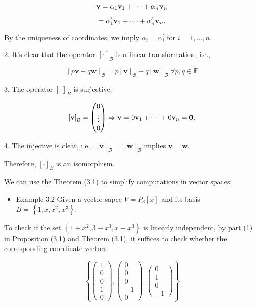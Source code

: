 \documentclass[11pt]{article}
\begin{document}
\[
\mathbf{v} = \alpha_1{\bf v}_1 + \cdots  + \alpha_n{\bf v}_n
\]

\[
= \alpha_1^{\prime }{\bf v}_1 + \cdots  + \alpha_n^{\prime }{\bf v}_n.
\]

By the uniqueness of coordinates, we imply \(\alpha_{i} = \alpha_{i}^{\prime }\) for \(i = 1,\ldots ,n\).

2. It’s clear that the operator \({\left\lbrack  \cdot \right\rbrack  }_{\mathcal{B}}\) is a linear transformation, i.e.,

\[
{\left\lbrack  p\mathbf{v} + q\mathbf{w}\right\rbrack  }_{\mathcal{B}} = p{\left\lbrack  \mathbf{v}\right\rbrack  }_{\mathcal{B}} + q{\left\lbrack  \mathbf{w}\right\rbrack  }_{\mathcal{B}}\;\forall p,q \in  \mathbb{F}
\]

3. The operator \({\left\lbrack  \cdot \right\rbrack  }_{B}\) is surjective:

\[
{\left\lbrack  \mathbf{v}\right\rbrack  }_{\mathcal{B}} = \left( \begin{matrix} 0 \\  \vdots \\  0 \end{matrix}\right)  \Rightarrow  \mathbf{v} = 0{\bf v}_1 + \cdots  + 0{\bf v}_n = \mathbf{0}.
\]

4. The injective is clear, i.e., \({\left\lbrack  \mathbf{v}\right\rbrack  }_{\mathcal{B}} = {\left\lbrack  \mathbf{w}\right\rbrack  }_{\mathcal{B}}\) implies \(\mathbf{v} = \mathbf{w}\).

Therefore, \({\left\lbrack  \cdot \right\rbrack  }_{B}\) is an isomorphism.

We can use the Theorem (3.1) to simplify computations in vector spaces:

\begin{itemize}
\item Example 3.2 Given a vector sapce \(V = {P}_{3}\left\lbrack  x\right\rbrack\) and its basis \(B = \left\{  {1,x,{x}^2,{x}^{3}}\right\}\).
\end{itemize}

To check if the set \(\left\{  {1 + {x}^2,3 - {x}^{3},x - {x}^{3}}\right\}\) is linearly independent, by part (1) in Proposition (3.1) and Theorem (3.1), it suffices to check whether the corresponding coordinate vectors

\[
\left\{  {\left( \begin{matrix} 1 \\  0 \\  0 \\  1 \\  0 \end{matrix}\right) ,\left( \begin{matrix} 0 \\  0 \\  0 \\   - 1 \\  0 \end{matrix}\right) ,\left( \begin{matrix} 0 \\  1 \\  0 \\   - 1 \end{matrix}\right) }\right\}
\]
\end{document}
